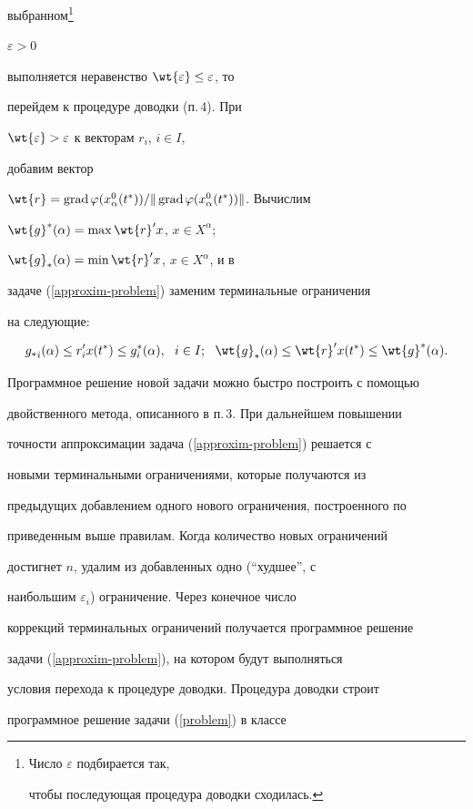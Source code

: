 выбранном\footnote{Число $\varepsilon$ подбирается так,


чтобы последующая процедура доводки сходилась.}


$\varepsilon>0$


выполняется неравенство $\wt{\varepsilon}\leq\varepsilon$, то


перейдем к процедуре доводки (п.\,4). При


$\wt{\varepsilon}>\varepsilon$ к векторам $r_i$, $i\in I$,


добавим вектор


$\wt{r}=\grad\varphi(x_\alpha^0(t^*))/\|\grad


\varphi(x_\alpha^0(t^*))\|$. Вычислим


$\wt{g}^*(\alpha)=\max\wt{r}'x$, $x\in X^\alpha$;


$\wt{g}_*(\alpha)=\min\wt{r}'x$, $x\in X^\alpha$, и в


задаче (\ref{approxim-problem}) заменим терминальные ограничения


на следующие:


$$


{g_*}_i(\alpha)\leq r'_ix(t^*)\leq g^*_i(\alpha),\ \ i\in I;


\ \ \wt{g}_*(\alpha)\leq \wt{r}'x(t^*)\leq \wt{g}^*(\alpha).


$$


Программное решение новой задачи можно быстро построить с помощью


двойственного метода, описанного в п.\,3. При дальнейшем повышении


точности аппроксимации задача (\ref{approxim-problem}) решается с


новыми терминальными ограничениями, которые получаются из


предыдущих добавлением одного нового ограничения, построенного по


приведенным выше правилам. Когда количество новых ограничений


достигнет $n$, удалим из добавленных одно (``худшее'', с


наибольшим $\varepsilon_i$) ограничение. Через конечное число


коррекций терминальных ограничений получается программное решение


задачи (\ref{approxim-problem}), на котором будут выполняться


условия перехода к процедуре доводки. Процедура доводки строит


программное решение задачи (\ref{problem}) в классе


